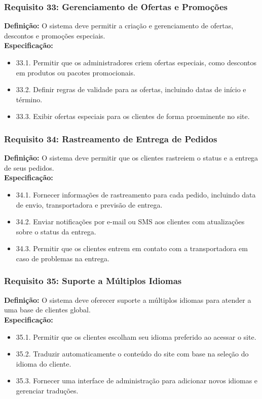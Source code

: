 \subsubsection{Requisito 33: Gerenciamento de Ofertas e Promoções}
\textbf{Definição:} O sistema deve permitir a criação e gerenciamento de ofertas, descontos e promoções especiais.
\\
\textbf{Especificação:}
\begin{itemize}
	\item 33.1. Permitir que os administradores criem ofertas especiais, como descontos em produtos ou pacotes promocionais.
	\item 33.2. Definir regras de validade para as ofertas, incluindo datas de início e término.
	\item 33.3. Exibir ofertas especiais para os clientes de forma proeminente no site.
\end{itemize}

\subsubsection{Requisito 34: Rastreamento de Entrega de Pedidos}
\textbf{Definição:} O sistema deve permitir que os clientes rastreiem o status e a entrega de seus pedidos.
\\
\textbf{Especificação:}
\begin{itemize}
	\item 34.1. Fornecer informações de rastreamento para cada pedido, incluindo data de envio, transportadora e previsão de entrega.
	\item 34.2. Enviar notificações por e-mail ou SMS aos clientes com atualizações sobre o status da entrega.
	\item 34.3. Permitir que os clientes entrem em contato com a transportadora em caso de problemas na entrega.
\end{itemize}

\subsubsection{Requisito 35: Suporte a Múltiplos Idiomas}
\textbf{Definição:} O sistema deve oferecer suporte a múltiplos idiomas para atender a uma base de clientes global.
\\
\textbf{Especificação:}
\begin{itemize}
	\item 35.1. Permitir que os clientes escolham seu idioma preferido ao acessar o site.
	\item 35.2. Traduzir automaticamente o conteúdo do site com base na seleção do idioma do cliente.
	\item 35.3. Fornecer uma interface de administração para adicionar novos idiomas e gerenciar traduções.
\end{itemize}

